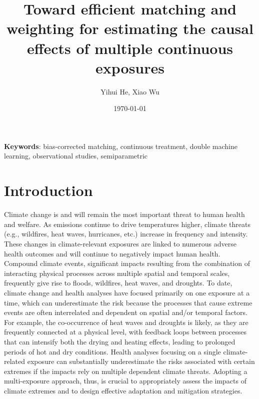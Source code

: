 \documentclass[11pt]{article}
\numberwithin{equation}{section}
\theoremstyle{definition}
\begin{document}
\setlength{\abovedisplayskip}{5pt}
\setlength{\belowdisplayskip}{5pt}
\setlength{\abovedisplayshortskip}{5pt}
\setlength{\belowdisplayshortskip}{5pt}
\hypersetup{colorlinks,breaklinks,urlcolor=blue,linkcolor=blue}



\title{\LARGE Toward efficient matching and weighting for estimating the causal effects of multiple continuous exposures}

\author{Yihui He, Xiao Wu}

\date{\today}

\maketitle

\vspace{-1em}

\begin{abstract}

\end{abstract}

{\bf Keywords}: bias-corrected matching, continuous treatment, double machine learning, observational studies, semiparametric


\section{Introduction}\label{sec:intro}

Climate change is and will remain the most important threat to human health and welfare. As emissions continue to drive temperatures higher, climate threats (e.g., wildfires, heat waves, hurricanes, etc.) increase in frequency and intensity. These changes in climate-relevant exposures are linked to numerous adverse health outcomes and will continue to negatively impact human health. Compound climate events, significant impacts resulting from the combination of interacting physical processes across multiple spatial and temporal scales, frequently give rise to floods, wildfires, heat waves, and droughts. To date, climate change and health analyses have focused primarily on one exposure at a time, which can underestimate the risk because the processes that cause extreme events are often interrelated and dependent on spatial and/or temporal factors. For example, the co-occurrence of heat waves and droughts is likely, as they are frequently connected at a physical level, with feedback loops between processes that can intensify both the drying and heating effects, leading to prolonged periods of hot and dry conditions. Health analyses focusing on a single climate-related exposure can substantially underestimate the risks associated with certain extremes if the impacts rely on multiple dependent climate threats. Adopting a multi-exposure approach, thus, is crucial to appropriately assess the impacts of climate extremes and to design effective adaptation and mitigation strategies.
\end{document}
